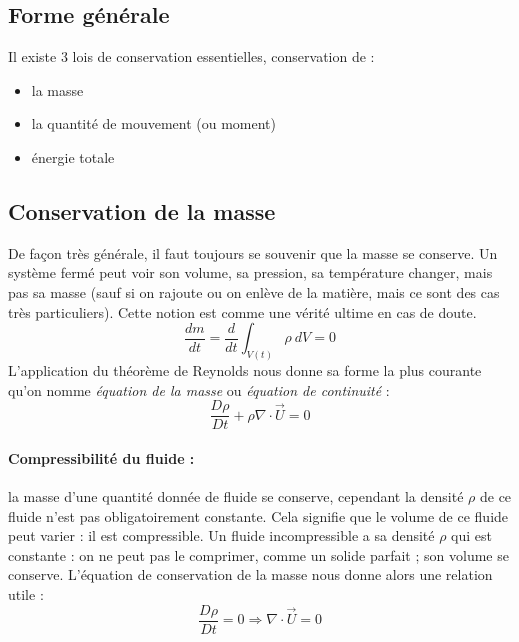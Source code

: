 
\subsection{Forme générale}



Il existe 3 lois de conservation essentielles, conservation de :
\begin{itemize}
    \item la masse
    \item la quantité de mouvement (ou moment)
    \item énergie totale
\end{itemize}

\subsection{Conservation de la masse}
De façon très générale, il faut toujours se souvenir que la masse se conserve. Un système fermé peut voir son volume, sa pression, sa température changer, mais pas sa masse (sauf si on rajoute ou on enlève de la matière, mais ce sont des cas très particuliers). Cette notion est comme une vérité ultime en cas de doute.
%
\begin{equation}
\frac{dm}{dt} = \frac{d}{dt} \int_{V(t)} {\rho~dV} = 0
\end{equation}
%
L'application du théorème de Reynolds nous donne sa forme la plus courante qu'on nomme \textit{équation de la masse} ou \textit{équation de continuité} :
%
\begin{equation}
\frac {D\rho}{Dt} + \rho \nabla \cdot \vec{U} = 0
\label{eq:masse}
\end{equation}
%
\paragraph{Compressibilité du fluide :} la masse d'une quantité donnée de fluide se conserve, cependant la densité $\rho$ de ce fluide n'est pas obligatoirement constante. Cela signifie que le volume de ce fluide peut varier : il est compressible. Un fluide incompressible a sa densité $\rho$ qui est constante : on ne peut pas le comprimer, comme un solide parfait ; son volume se conserve. L'équation de conservation de la masse nous donne alors une relation utile :
%
\begin{equation}
\frac {D\rho}{Dt} = 0 \Rightarrow \nabla \cdot \vec{U} = 0
\end{equation}

